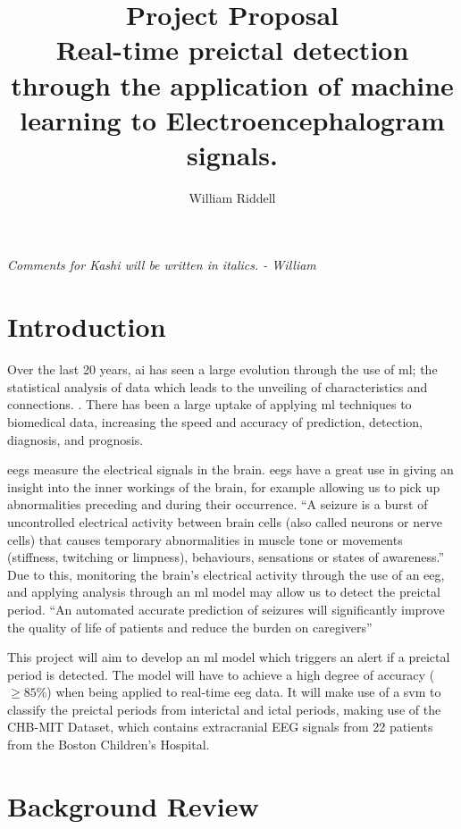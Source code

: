 \documentclass[12pt]{article}
\title{Project Proposal \\ Real-time preictal detection through the application of machine learning to Electroencephalogram signals.}
\author{William Riddell}
\begin{document}
\maketitle

\textit{Comments for Kashi will be written in italics. - William}

\section{Introduction}

Over the last 20 years, \acrfull{ai} has seen a large evolution through the use of \acrfull{ml}; the statistical analysis of data which leads to the unveiling of characteristics and connections. \cite{awad2015efficient}. There has been a large uptake of applying \acrshort{ml} techniques to biomedical data, increasing the speed and accuracy of prediction, detection, diagnosis, and prognosis. 

\acrfull{eegs} measure the electrical signals in the brain. \acrshort{eegs} have a great use in giving an insight into the inner workings of the brain, for example allowing us to pick up abnormalities preceding and during their occurrence. ``A seizure is a burst of uncontrolled electrical activity between brain cells (also called neurons or nerve cells) that causes temporary abnormalities in muscle tone or movements (stiffness, twitching or limpness), behaviours, sensations or states of awareness.'' \cite{johnHopkinsTypesOfSeizures} Due to this, monitoring the brain's electrical activity through the use of an \acrshort{eeg}, and applying analysis through an \acrshort{ml} model may allow us to detect the preictal period. ``An automated accurate prediction of seizures will significantly improve the quality of life of patients and reduce the burden on caregivers'' \cite{acharya2018automated}

This project will aim to develop an \acrshort{ml} model which triggers an alert if a preictal period is detected. The model will have to achieve a high degree of accuracy ($\geq85\%$) when being applied to real-time \acrshort{eeg} data. It will make use of a \acrfull{svm} to classify the preictal periods from interictal and ictal periods, making use of the CHB-MIT Dataset, which contains extracranial EEG signals from 22 patients from the Boston Children's Hospital. \cite{shoeb2009application} \cite{PhysioNet}


\section{Background Review}
\end{document}
